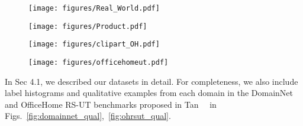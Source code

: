 \documentclass[10pt,twocolumn,letterpaper]{article}
\begin{document}
 \begin{figure*}
    \centering   
    \begin{subfigure}[b]{0.24\textwidth}
        \centering
        \texttt{[image: figures/Real\_World.pdf]}
        \caption[]{{}}
        \label{fig:real_world}
    \end{subfigure}
    \begin{subfigure}[b]{0.24\textwidth}
        \centering
        \texttt{[image: figures/Product.pdf]}
        \caption[]{{}}
        \label{fig:product}
    \end{subfigure}
    \begin{subfigure}[b]{0.24\textwidth}
        \centering
        \texttt{[image: figures/clipart\_OH.pdf]}
        \caption[]{{}}
        \label{fig:clipart_OH}
    \end{subfigure}
    \begin{subfigure}[b]{\textwidth}
        \centering
        \texttt{[image: figures/officehomeut.pdf]}
        \caption[]{{}}
        \label{fig:ohrsut}
    \end{subfigure}
    \caption[]
    {OfficeHome~\cite{venkateswara2017deep} statistics: (a)-(d): Qualitative examples from each domain. (e): Label histograms for the UT target splits proposed in Tan~\etal~\cite{tan2019generalized}.}
    \label{fig:ohrsut_qual}
\end{figure*}

In Sec 4.1, we described our datasets in detail. For completeness, we also include label histograms and qualitative examples from each domain in the DomainNet and OfficeHome RS-UT benchmarks proposed in Tan~\etal~\cite{tan2019generalized} in Figs.~\ref{fig:domainnet_qual},~\ref{fig:ohrsut_qual}.
\end{document}
